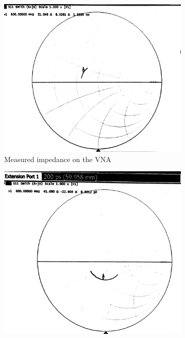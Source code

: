 \documentclass[10pt]{article}
\begin{document}
\begin{figure}[ht]
  \centering
  \begin{subfigure}[b]{0.45\textwidth}
      \includegraphics[width=\textwidth]{../photos/lab3/load_as_is.jpg}
      \caption{Measured impedance on the VNA}
  \end{subfigure}
  \quad
  \begin{subfigure}[b]{0.45\textwidth}
    \includegraphics[width=\textwidth]{../photos/lab3/load_deembedded.jpg}

\end{subfigure}
\end{figure}
\end{document}
